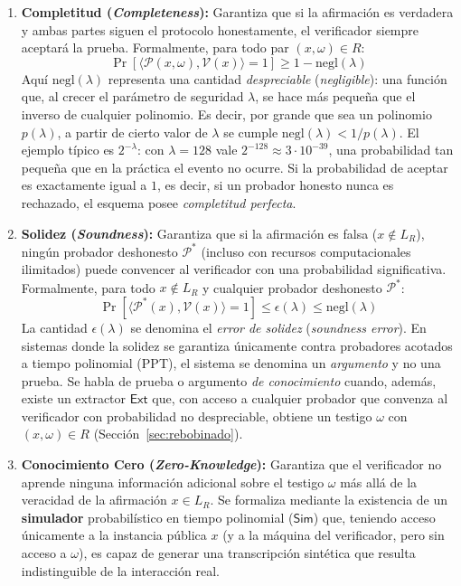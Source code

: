 \begin{enumerate}
    \item \textbf{Completitud (\textit{Completeness}):} Garantiza que si la afirmación es verdadera y ambas partes siguen el protocolo honestamente, el verificador siempre aceptará la prueba. Formalmente, para todo par $(x, \omega) \in R$:
    \begin{equation}
    \Pr\left[ \langle \mathcal{P}(x, \omega), \mathcal{V}(x) \rangle = 1 \right] \ge 1 - \mathrm{negl}(\lambda)
    \end{equation}
    Aquí $\mathrm{negl}(\lambda)$ representa una cantidad \textit{despreciable} (\textit{negligible}): una función que, al crecer el parámetro de seguridad $\lambda$, se hace más pequeña que el inverso de cualquier polinomio. Es decir, por grande que sea un polinomio $p(\lambda)$, a partir de cierto valor de $\lambda$ se cumple $\mathrm{negl}(\lambda) < 1/p(\lambda)$. El ejemplo típico es $2^{-\lambda}$: con $\lambda = 128$ vale $2^{-128} \approx 3 \cdot 10^{-39}$, una probabilidad tan pequeña que en la práctica el evento no ocurre. Si la probabilidad de aceptar es exactamente igual a $1$, es decir, si un probador honesto nunca es rechazado, el esquema posee \textit{completitud perfecta}.

    \item \textbf{Solidez (\textit{Soundness}):} Garantiza que si la afirmación es falsa ($x \notin L_R$), ningún probador deshonesto $\mathcal{P}^*$ (incluso con recursos computacionales ilimitados) puede convencer al verificador con una probabilidad significativa. Formalmente, para todo $x \notin L_R$ y cualquier probador deshonesto $\mathcal{P}^*$:
    \begin{equation}
    \Pr\left[ \langle \mathcal{P}^*(x), \mathcal{V}(x) \rangle = 1 \right] \le \epsilon(\lambda) \le \mathrm{negl}(\lambda)
    \end{equation}
    La cantidad $\epsilon(\lambda)$ se denomina el \textit{error de solidez} (\textit{soundness error}). En sistemas donde la solidez se garantiza únicamente contra probadores acotados a tiempo polinomial (PPT), el sistema se denomina un \textit{argumento} y no una prueba. Se habla de prueba o argumento \textit{de conocimiento} cuando, además, existe un extractor $\mathsf{Ext}$ que, con acceso a cualquier probador que convenza al verificador con probabilidad no despreciable, obtiene un testigo $\omega$ con $(x, \omega) \in R$ (Sección~\ref{sec:rebobinado}).

    \item \textbf{Conocimiento Cero (\textit{Zero-Knowledge}):} Garantiza que el verificador no aprende ninguna información adicional sobre el testigo $\omega$ más allá de la veracidad de la afirmación $x \in L_R$. Se formaliza mediante la existencia de un \textbf{simulador} probabilístico en tiempo polinomial ($\mathsf{Sim}$) que, teniendo acceso únicamente a la instancia pública $x$ (y a la máquina del verificador, pero sin acceso a $\omega$), es capaz de generar una transcripción sintética que resulta indistinguible de la interacción real.


\end{enumerate}
